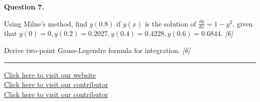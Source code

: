 \documentclass[11pt,a4paper]{article}
\newcommand{\pts}[1]{\hfill   \textit{[#1]}}
\begin{document}
\medskip


\noindent   \textbf{Question 7.}

\begin{parts}
  \item Using Milne's method, find $y(0.8)$ if $y(x)$ is the solution of $\frac{dy}{dx} = 1 - y^2$, given that $y(0) = 0, y(0.2) = 0.2027, y(0.4) = 0.4228, y(0.6) = 0.6844$. \pts{6}
  \item Derive two-point Gauss-Legendre formula for integration. \pts{6}
\end{parts}

\vfill
\rule{\linewidth}{0.4pt}

\begin{center}\small
\href{https://bhu-exam.vercel.app/}{Click here to visit our website}\\[4pt]\href{https://me-aryan.vercel.app/}{Click here to visit our contributor}\\[4pt]\href{https://quashan-me.vercel.app/}{Click here to visit our contributor}
\end{center}
\end{document}
